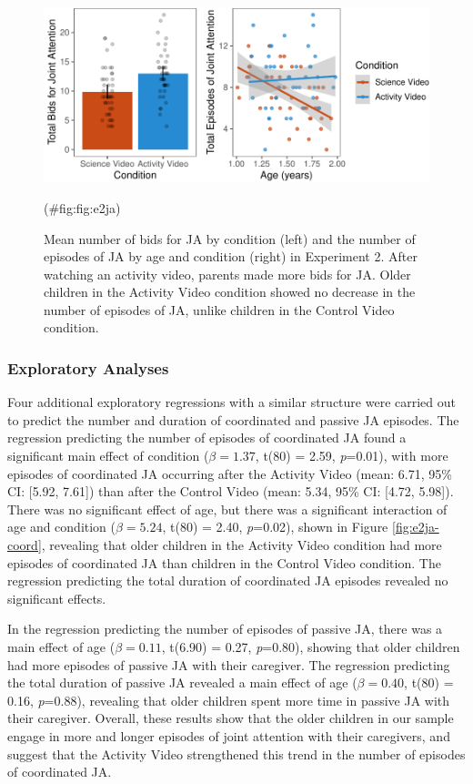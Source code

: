 \documentclass[man,floatsintext]{apa6}
\begin{document}
\begin{figure}[H]

{\centering \includegraphics{figs/fig:e2ja-1} 

}

\caption{\label{fig:e2ja} Mean number of bids for JA by condition (left) and the number of episodes of JA by age and condition (right) in Experiment 2. After watching an activity video, parents made more bids for JA. Older children in the Activity Video condition showed no decrease in the number of episodes of JA, unlike children in the Control Video condition.}(\#fig:fig:e2ja)
\end{figure}

\hypertarget{exploratory-analyses}{%
\subsubsection{Exploratory Analyses}\label{exploratory-analyses}}

Four additional exploratory regressions with a similar structure were carried out to predict the number and duration of coordinated and passive JA episodes.
The regression predicting the number of episodes of coordinated JA found a significant main effect of condition (\(\beta=1.37\), t(80) = 2.59, \emph{p}=0.01), with more episodes of coordinated JA occurring after the Activity Video (mean: 6.71, 95\% CI: {[}5.92, 7.61{]}) than after the Control Video (mean: 5.34, 95\% CI: {[}4.72, 5.98{]}).
There was no significant effect of age, but there was a significant interaction of age and condition (\(\beta=5.24\), t(80) = 2.40, \emph{p}=0.02), shown in Figure \ref{fig:e2ja-coord}, revealing that older children in the Activity Video condition had more episodes of coordinated JA than children in the Control Video condition.
The regression predicting the total duration of coordinated JA episodes revealed no significant effects.

In the regression predicting the number of episodes of passive JA, there was a main effect of age (\(\beta=0.11\), t(6.90) = 0.27, \emph{p}=0.80), showing that older children had more episodes of passive JA with their caregiver.
The regression predicting the total duration of passive JA revealed a main effect of age (\(\beta=0.40\), t(80) = 0.16, \emph{p}=0.88), revealing that older children spent more time in passive JA with their caregiver.
Overall, these results show that the older children in our sample engage in more and longer episodes of joint attention with their caregivers, and suggest that the Activity Video strengthened this trend in the number of episodes of coordinated JA.
\end{document}
